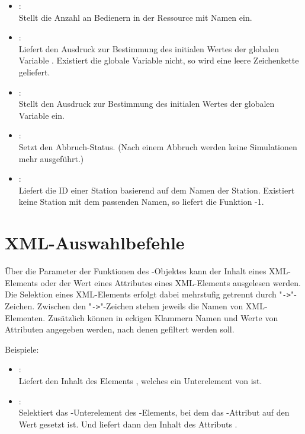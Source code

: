 \begin{itemize}
\item
{}:\\
Stellt die Anzahl an Bedienern in der Ressource mit Namen  ein.

\item
{}:\\
Liefert den Ausdruck zur Bestimmung des initialen Wertes der globalen Variable
. Existiert die globale Variable nicht, so wird
eine leere Zeichenkette geliefert.

\item
{}:\\
Stellt den Ausdruck zur Bestimmung des initialen Wertes der globalen Variable
 ein.

\item
{}:\\
Setzt den Abbruch-Status. (Nach einem Abbruch werden keine Simulationen mehr ausgeführt.)

\item
{}:\\
Liefert die ID einer Station basierend auf dem Namen der Station.
Existiert keine Station mit dem passenden Namen, so liefert die Funktion -1.

\end{itemize}



\chapter{XML-Auswahlbefehle}

Über die Parameter der Funktionen des -Objektes kann der Inhalt eines XML-Elements oder der Wert eines
Attributes eines XML-Elements ausgelesen werden. Die Selektion eines XML-Elements erfolgt dabei mehrstufig
getrennt durch "\texttt{->}"-Zeichen. Zwischen den "\texttt{->}"-Zeichen stehen jeweils die Namen von XML-Elementen.
Zusätzlich können in eckigen Klammern Namen und Werte von Attributen angegeben werden, nach denen gefiltert werden soll.

Beispiele:

\begin{itemize}

\item
{}:\\
Liefert den Inhalt des Elements , welches ein Unterelement von  ist.	

\item
{}:\\
Selektiert das -Unterelement des -Elements, bei
dem das -Attribut auf den Wert  gesetzt ist. Und liefert dann den Inhalt des Attributs
.

\end{itemize}